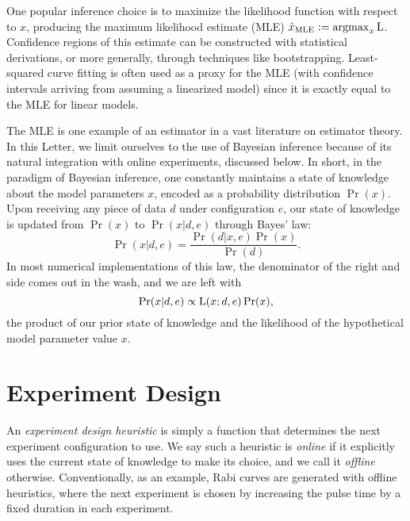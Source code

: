 \documentclass[aps,nofootinbib,prl,twocolumn,superscriptaddress]{revtex4}
\newcommand{\mps}{x}
\newcommand{\eps}{e}
\newcommand{\data}{d}
\newcommand{\MLE}{\text{MLE}}
\begin{document}
One popular inference choice is to maximize the likelihood function
with respect to $\mps$, producing the maximum likelihood estimate (MLE) 
$\hat{\mps}_\MLE:=\operatorname{argmax}_\mps \Lhood$.
Confidence regions of this estimate can be constructed 
with statistical derivations, or more generally, through techniques like bootstrapping.
Least-squared curve fitting is often used as a proxy for the MLE (with 
confidence intervals arriving from assuming
a linearized model) since it is exactly equal to the MLE
for linear models.

The MLE is one example of an estimator in a vast literature on estimator theory.
In this Letter, we limit ourselves to the use of Bayesian inference because of its
natural integration with online experiments, discussed below.
In short, in the paradigm of Bayesian inference, one constantly
maintains a state of knowledge about the model parameters $\mps$, encoded
as a probability distribution $\Pr(\mps)$.
Upon receiving any piece of data $\data$ under configuration $\eps$,
our state of knowledge is updated from $\Pr(\mps)$ to $\Pr(\mps|\data,\eps)$
through Bayes' law:
\begin{equation}
    \Pr(\mps|\data,\eps)
        = \frac{\Pr(\data|\mps,\eps)\Pr(\mps)}{\Pr(d)}.
\end{equation}
In most numerical implementations of this law, the denominator of the 
right and side comes out in the wash, and we are left with
\begin{equation}
    \Pr(\mps|\data,\eps)
        \propto \Lhood(\mps;\data,\eps)\Pr(\mps),
\end{equation}
the product of our prior state of knowledge and the likelihood
of the hypothetical model parameter value $\mps$.

\section{Experiment Design}
\label{sec:experiment-design}

An \textit{experiment design heuristic} is simply a function that 
determines the next experiment configuration to use.
We say such a heuristic is \textit{online} if it explicitly uses the current
state of knowledge to make its choice, and we call it \textit{offline} 
otherwise.
Conventionally, as an example, Rabi curves are generated 
with offline heuristics, where the next experiment is chosen by 
increasing the pulse time by a fixed duration in each experiment.
\end{document}
